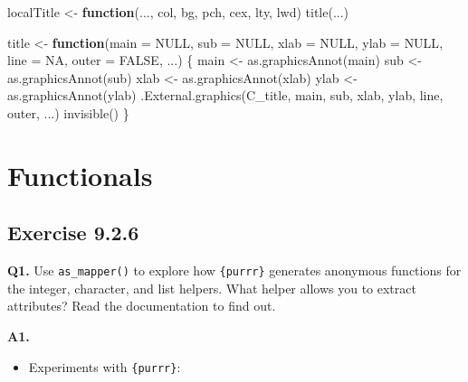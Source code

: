 \documentclass[
]{book}
\newenvironment{Shaded}{\begin{snugshade}}{\end{snugshade}}
\newcommand{\AttributeTok}[1]{\textcolor[rgb]{0.77,0.63,0.00}{#1}}
\newcommand{\ConstantTok}[1]{\textcolor[rgb]{0.00,0.00,0.00}{#1}}
\newcommand{\ControlFlowTok}[1]{\textcolor[rgb]{0.13,0.29,0.53}{\textbf{#1}}}
\newcommand{\FunctionTok}[1]{\textcolor[rgb]{0.00,0.00,0.00}{#1}}
\newcommand{\NormalTok}[1]{#1}
\newcommand{\OtherTok}[1]{\textcolor[rgb]{0.56,0.35,0.01}{#1}}
\providecommand{\tightlist}{%
  \setlength{\itemsep}{0pt}\setlength{\parskip}{0pt}}
\begin{document}
\begin{Shaded}
\begin{Highlighting}[]
\NormalTok{localTitle }\OtherTok{\textless{}{-}} \ControlFlowTok{function}\NormalTok{(..., col, bg, pch, cex, lty, lwd) }\FunctionTok{title}\NormalTok{(...)}

\NormalTok{title }\OtherTok{\textless{}{-}} \ControlFlowTok{function}\NormalTok{(}\AttributeTok{main =} \ConstantTok{NULL}\NormalTok{, }\AttributeTok{sub =} \ConstantTok{NULL}\NormalTok{, }\AttributeTok{xlab =} \ConstantTok{NULL}\NormalTok{, }\AttributeTok{ylab =} \ConstantTok{NULL}\NormalTok{,}
                  \AttributeTok{line =} \ConstantTok{NA}\NormalTok{, }\AttributeTok{outer =} \ConstantTok{FALSE}\NormalTok{, ...) \{}
\NormalTok{  main }\OtherTok{\textless{}{-}} \FunctionTok{as.graphicsAnnot}\NormalTok{(main)}
\NormalTok{  sub }\OtherTok{\textless{}{-}} \FunctionTok{as.graphicsAnnot}\NormalTok{(sub)}
\NormalTok{  xlab }\OtherTok{\textless{}{-}} \FunctionTok{as.graphicsAnnot}\NormalTok{(xlab)}
\NormalTok{  ylab }\OtherTok{\textless{}{-}} \FunctionTok{as.graphicsAnnot}\NormalTok{(ylab)}
  \FunctionTok{.External.graphics}\NormalTok{(C\_title, main, sub, xlab, ylab, line, outer, ...)}
  \FunctionTok{invisible}\NormalTok{()}
\NormalTok{\}}
\end{Highlighting}
\end{Shaded}

\hypertarget{functionals}{%
\chapter{Functionals}\label{functionals}}

\hypertarget{exercise-9.2.6}{%
\section{Exercise 9.2.6}\label{exercise-9.2.6}}

\textbf{Q1.} Use \texttt{as\_mapper()} to explore how \texttt{\{purrr\}} generates anonymous functions for the integer, character, and list helpers. What helper allows you to extract attributes? Read the documentation to find out.

\textbf{A1.}

\begin{itemize}
\tightlist
\item
  Experiments with \texttt{\{purrr\}}:
\end{itemize}
\end{document}
